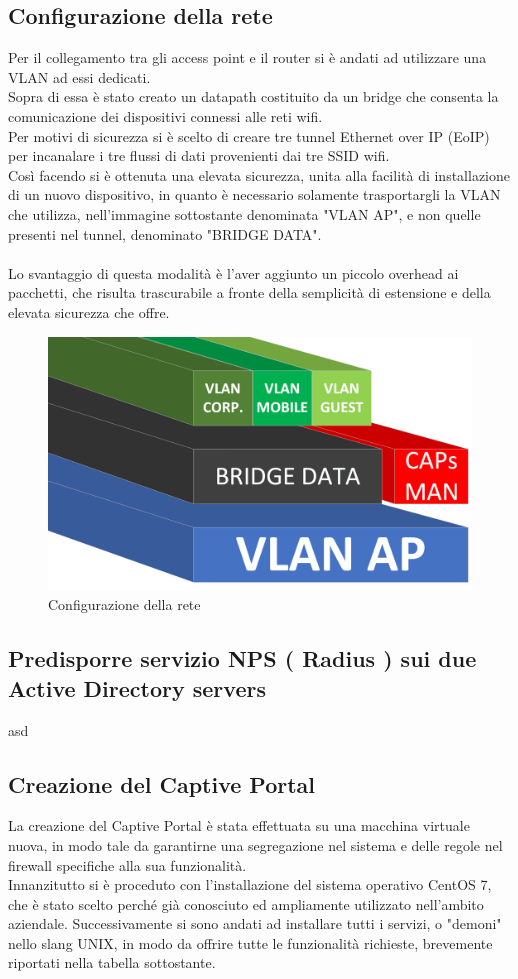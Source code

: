 \documentclass[Realizzazione.tex]{subfiles}
\begin{document}
\subsection{Configurazione della rete}
Per il collegamento tra gli access point e il router si è andati ad utilizzare una VLAN ad essi dedicati. \\
Sopra di essa è stato creato un datapath costituito da un bridge che consenta la comunicazione dei dispositivi connessi alle reti wifi. \\
Per motivi di sicurezza si è scelto di creare tre tunnel Ethernet over IP (EoIP) per incanalare i tre flussi di dati provenienti dai tre SSID wifi. \\
Così facendo si è ottenuta una elevata sicurezza, unita alla facilità di installazione di un nuovo dispositivo, in quanto è necessario solamente trasportargli la VLAN che utilizza, nell'immagine sottostante denominata "VLAN AP", e non quelle presenti nel tunnel, denominato "BRIDGE DATA". \\\\
Lo svantaggio di questa modalità è l'aver aggiunto un piccolo overhead ai pacchetti, che risulta trascurabile a fronte della semplicità di estensione e della elevata sicurezza che offre.

\begin{figure}[H]
	\centering
	\includegraphics[width=0.6\linewidth]{"images/VLAN"}
	\caption{Configurazione della rete}
	\label{fig:Configurazione della rete}
\end{figure}

\subsection{Predisporre servizio NPS ( Radius ) sui due Active Directory servers} 
asd
\subsection{Creazione del Captive Portal}
La creazione del Captive Portal è stata effettuata su una macchina virtuale nuova, in modo tale da garantirne una segregazione nel sistema e delle regole nel firewall specifiche alla sua funzionalità. \\
Innanzitutto si è proceduto con l'installazione del sistema operativo CentOS 7, che è stato scelto perché già conosciuto ed ampliamente utilizzato nell'ambito aziendale.
Successivamente si sono andati ad installare tutti i servizi, o "demoni" nello slang UNIX, in modo da offrire tutte le funzionalità richieste, brevemente riportati nella tabella sottostante.
\end{document}
